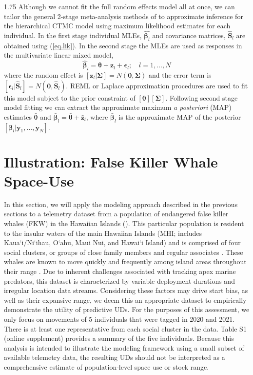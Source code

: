 \documentclass[12pt]{article}
\newcommand{\by}{\ensuremath{\mathbf{y}}}
\newcommand{\bz}{\ensuremath{\mathbf{z}}}
\newcommand{\bb}{\ensuremath{\boldsymbol{\beta}}}
\newcommand{\be}{\ensuremath{\boldsymbol{\epsilon}}}
\newcommand{\bSig}{\ensuremath{\boldsymbol{\Sigma}}}
\newcommand{\bt}{\ensuremath{\boldsymbol{\theta}}}
\begin{document}
\begin{spacing}{1.75}
Although we cannot fit the full random effects model all at once, we can tailor the general 2-stage meta-analysis methods of \cite{johnson2022greater} to approximate inference for the hierarchical CTMC model using maximum likelihood estimates for each individual. In the first stage individual MLEs, $\hat{\bb_l}$ and covariance matrices, $\hat{\mathbf{S}}_l$ are obtained using (\ref{eq.lik}). In the second stage the MLEs are used as responses in the multivariate linear mixed model,
\[
\hat{\bb}_l = \bt + \bz_l + \be_l; \quad l=1,\dots,N
\]
where the random effect is $[\bz_l|\bSig] = N(\mathbf{0},\bSig)$ and the error term is $[\be_l|\hat{\mathbf{S}}_l] = N(\mathbf{0},\hat{\mathbf{S}}_l)$. REML or Laplace approximation procedures are used to fit this model subject to the prior constraint of $[\bt][\bSig]$. Following second stage model fitting we can extract the approximate maximum {\it a posteriori} (MAP) estimates $\bar{\bt}$ and  $\bar{\bb}_l = \bar{\bt} + \bar{\bz}_l$, where $\bar{\bb}_l$ is the approximate MAP of the posterior $[\bb_l|\by_1,\dots,\by_N]$.


\section{Illustration: False Killer Whale Space-Use}

In this section, we will apply the modeling approach described in the previous sections to a telemetry dataset from a population of endangered false killer whales (FKW) in the Hawaiian Islands (\citealt{baird2016lives}). This particular population is resident to the insular waters of the main Hawaiian Islands (MHI; includes Kaua`i/Ni`ihau, O`ahu, Maui Nui, and Hawai`i Island) and is comprised of four social clusters, or groups of close family members and regular associates \citep{baird2008false, baird2016lives, martien2019fidelity,MahaffyEtAl2023a}. These whales are known to move quickly and frequently among island areas throughout their range \citep{baird2010movements, baird2012range, baird2016lives}. Due to inherent challenges associated with tracking apex marine predators, this dataset is characterized by variable deployment durations and irregular location data streams. Considering these factors may drive start bias, as well as their expansive range, we deem this an appropriate dataset to empirically demonstrate the utility of predictive UDs. For the purposes of this assessment, we only focus on movements of 5 individuals that were tagged in 2020 and 2021. There is at least one representative from each social cluster in the data. Table S1 (online supplement) provides a summary of the five individuals. Because this analysis is intended to illustrate the modeling framework using a small subset of available telemetry data, the resulting UDs should not be interpreted as a comprehensive estimate of population-level space use or stock range.    


\end{spacing}
\end{document}
